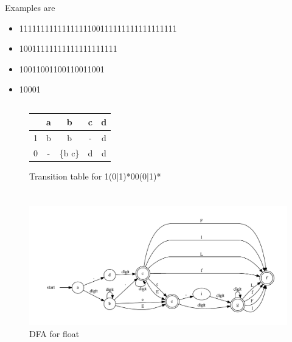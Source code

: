\documentclass{article}
\begin{document}
Examples are 
\begin{itemize}
  \item 1111111111111111100111111111111111111
  \item 10011111111111111111111
  \item 10011001100110011001
  \item 10001
\end{itemize}

\newpage

\subsection{}
\begin{figure}[h]
\begin{tabular}{|l||c|c|c|c|}
\hline
 & a & b & c & d\\
\hline
\hline
1 & b & b & - & d\\
0 & - & \{b c\} & d & d \\
\hline
\end{tabular}
\caption{Transition table for 1(0|1)*00(0|1)*}
\end{figure}
\section{}
\begin{figure}[h]
\centerline{\includegraphics[width=427px]{NDFA4.pdf}}
\caption{DFA for float}
\end{figure}
\end{document}
